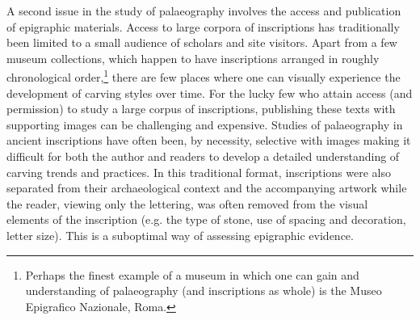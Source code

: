 \documentclass[amsthm,ebook]{saparticle}
\begin{document}
A second issue in the study of palaeography involves the access and publication of epigraphic materials. Access to
large corpora of inscriptions has traditionally been limited to a small audience of scholars and site visitors. Apart
from a few museum collections, which happen to have inscriptions arranged in roughly chronological order,\footnote{
Perhaps the finest example of a museum in which one can gain and understanding of palaeography (and inscriptions as
whole) is the Museo Epigrafico Nazionale, Roma. } there are few places where one can visually experience the
development of carving styles over time. For the lucky few who attain access (and permission) to study a large corpus
of inscriptions, publishing these texts with supporting images can be challenging and expensive. Studies of
palaeography in ancient inscriptions have often been, by necessity, selective with images making it difficult for both
the author and readers to develop a detailed understanding of carving trends and practices. In this traditional format,
inscriptions were also separated from their archaeological context and the accompanying artwork while the reader,
viewing only the lettering, was often removed from the visual elements of the inscription (e.g. the type of stone, use
of spacing and decoration, letter size). This is a suboptimal way of assessing epigraphic evidence. 
\end{document}
